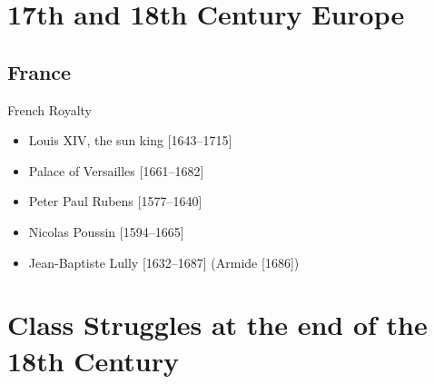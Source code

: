 

\section{17th and 18th Century Europe}
\subsection{France}
\begin{frame}{French Royalty}

	\begin{itemize}
		\item<1-2,5,7,9>Louis XIV, the sun king [1643--1715]
		\item<2-2,5,7,9>Palace of Versailles [1661--1682]
		\item<5,7,9>Peter Paul Rubens [1577--1640]
		\item<7,9>Nicolas Poussin [1594--1665]
		\item<9>Jean-Baptiste Lully [1632--1687] (Armide [1686])
	\end{itemize}
\end{frame}


\section{Class Struggles at the end of the 18th Century}
